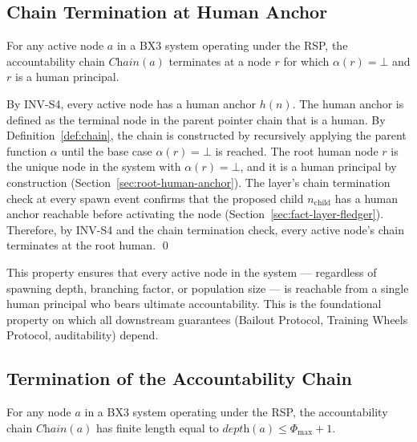 \subsection{Chain Termination at Human Anchor}
\label{sec:chain-termination}

\begin{property}
For any active node $a$ in a BX3 system operating under the RSP, the accountability chain $\textit{Chain}(a)$ terminates at a node $r$ for which $\alpha(r) = \bot$ and $r$ is a human principal.
\end{property}

\begin{Proof}
By INV-S4, every active node has a human anchor $h(n)$. The human anchor is defined as the terminal node in the parent pointer chain that is a human. By Definition~\ref{def:chain}, the chain is constructed by recursively applying the parent function $\alpha$ until the base case $\alpha(r) = \bot$ is reached. The root human node $r$ is the unique node in the system with $\alpha(r) = \bot$, and it is a human principal by construction (Section~\ref{sec:root-human-anchor}). The \fact{} layer's chain termination check at every spawn event confirms that the proposed child $n_{\text{child}}$ has a human anchor reachable before activating the node (Section~\ref{sec:fact-layer-fledger}). Therefore, by INV-S4 and the chain termination check, every active node's chain terminates at the root human. \qed
\end{Proof}

This property ensures that every active node in the system — regardless of spawning depth, branching factor, or population size — is reachable from a single human principal who bears ultimate accountability. This is the foundational property on which all downstream guarantees (Bailout Protocol, Training Wheels Protocol, auditability) depend.

\subsection{Termination of the Accountability Chain}
\label{sec:accountability-chain-termination}

\begin{property}
For any node $a$ in a BX3 system operating under the RSP, the accountability chain $\textit{Chain}(a)$ has finite length equal to $\textit{depth}(a) \leq \Phi_{\max} + 1$.
\end{property}

